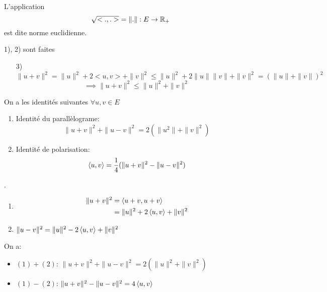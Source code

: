 \begin{lemma}
   L'application
   \[
   \sqrt{<.,.>} = \| . \|: E \to \mathbb{R}_+ 
   \] 
   est dite norme euclidienne.
\end{lemma}
\begin{explanation}
    1), 2) sont faites\\
    \begin{itemize}
        \item[3)] $\| u + v \|^2 = \|u\|^2 + 2<u,v> + \|v\|^2 \le \|u\|^2 + 2\|u\|\|v\| + \|v\|^2 = (\|u\| + \|v\|)^2$
            \[
            \implies \|u + v\|^2 \le \|u\|^2 + \|v\|^2
            \] 
    \end{itemize}
\end{explanation}
\begin{prop}
   On a les identités suivantes $\forall u, v \in E$ 
   \begin{enumerate}
       \item Identité du parallèlograme:
           \[
           \|u + v\|^2 + \|u - v\|^2 = 2(\|u^2\| + \|v\|^2)
           \] 
       \item Identité de polarisation:
           \[
               \left\langle u, v \right\rangle = \frac{1}{4}(\|u + v\|^2 - \|u - v\|^2)
           \] 
   \end{enumerate}
\end{prop}
\begin{explanation}.
   \begin{enumerate}
       \item 
           \begin{align*}
               \|u + v\|^2 &= \left\langle u + v, u + v \right\rangle\\
                           &= \|u\|^2 + 2\left\langle u,v \right\rangle + \|v\|^2
           \end{align*}
       \item $\|u - v\|^2 = \|u\|^2 - 2\left\langle u, v \right\rangle + \|v\|^2$
   \end{enumerate} 
   On a:
   \begin{itemize}
       \item 
           $(1) + (2)$:  $\|u + v\|^2 + \|u - v\|^2 = 2 (\|u\|^2 + \|v\|^2)$
       \item $(1) - (2)$:  $\|u + v\|^2 - \|u - v\|^2 = 4\left\langle u, v \right\rangle$ 
   \end{itemize}
\end{explanation}
